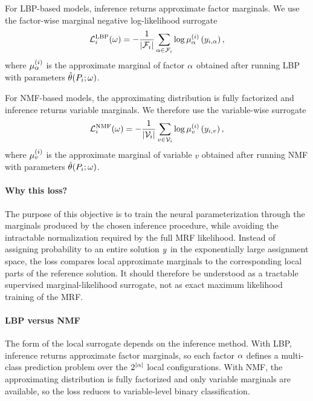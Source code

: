 For LBP-based models, inference returns approximate factor marginals. We use the factor-wise marginal negative log-likelihood surrogate
\begin{equation}
\mathcal{L}_i^{\mathrm{LBP}}(\omega)
=
-\frac{1}{|\mathcal{F}_i|}
\sum_{\alpha \in \mathcal{F}_i}
\log
\mu_{\alpha}^{(i)}
\left(
    y_{i,\alpha}
\right),
\end{equation}
where $\mu_{\alpha}^{(i)}$ is the approximate marginal of factor $\alpha$ obtained after running LBP with parameters $\hat{\theta}(P_i;\omega)$.

For NMF-based models, the approximating distribution is fully factorized and inference returns variable marginals. We therefore use the variable-wise surrogate
\begin{equation}
\mathcal{L}_i^{\mathrm{NMF}}(\omega)
=
-\frac{1}{|\mathcal{V}_i|}
\sum_{v \in \mathcal{V}_i}
\log
\mu_{v}^{(i)}
\left(
    y_{i,v}
\right),
\end{equation}
where $\mu_{v}^{(i)}$ is the approximate marginal of variable $v$ obtained after running NMF with parameters $\hat{\theta}(P_i;\omega)$.

\paragraph{Why this loss?} 
The purpose of this objective is to train the neural parameterization through the marginals produced by the chosen inference procedure, while avoiding the intractable normalization required by the full MRF likelihood. Instead of assigning probability to an entire solution $y$ in the exponentially large assignment space, the loss compares local approximate marginals to the corresponding local parts of the reference solution. It should therefore be understood as a tractable supervised marginal-likelihood surrogate, not as exact maximum likelihood training of the MRF.

\paragraph{LBP versus NMF} 
The form of the local surrogate depends on the inference method. With LBP, inference returns approximate factor marginals, so each factor $\alpha$ defines a multi-class prediction problem over the $2^{|\alpha|}$ local configurations. With NMF, the approximating distribution is fully factorized and only variable marginals are available, so the loss reduces to variable-level binary classification.

